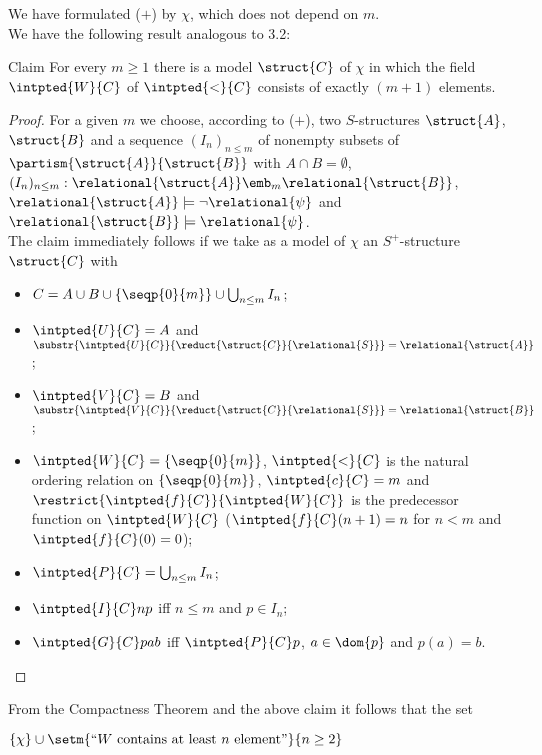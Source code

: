 \begin{enumerate}[1.]
\begin{itemize}
\end{itemize}
We have formulated ($+$) by $\chi$, which does not depend on $m$.\bigskip\\
We have the following result analogous to 3.2:\medskip\\
\begin{theorem}{Claim}
For every $m \geq 1$ there is a model $\struct{C}$ of $\chi$ in which the field $\intpted{W}{C}$ of $\intpted{<}{C}$ consists of exactly $(m + 1)$ elements.
\end{theorem}
\begin{proof}
For a given $m$ we choose, according to ($+$), two $S$-structures $\struct{A}$, $\struct{B}$ and a sequence $(I_n)_{n \leq m}$ of nonempty subsets of $\partism{\struct{A}}{\struct{B}}$ with $A \cap B = \emptyset$, $(I_n)_{n \leq m}: \relational{\struct{A}} \emb_m \relational{\struct{B}}$, $\relational{\struct{A}} \models \neg\relational{\psi}$ and $\relational{\struct{B}} \models \relational{\psi}$.\medskip\\
The claim immediately follows if we take as a model of $\chi$ an $S^+$-structure $\struct{C}$ with
\begin{itemize}
\item $C = A \cup B \cup \{\seqp{0}{m}\} \cup \bigcup_{n \leq m} I_n$;
\item $\intpted{U}{C} = A$ and $\substr{\intpted{U}{C}}{\reduct{\struct{C}}{\relational{S}}} = \relational{\struct{A}}$;
\item $\intpted{V}{C} = B$ and $\substr{\intpted{V}{C}}{\reduct{\struct{C}}{\relational{S}}} = \relational{\struct{B}}$;
\item $\intpted{W}{C} = \{\seqp{0}{m}\}$, $\intpted{<}{C}$ is the natural ordering relation on $\{\seqp{0}{m}\}$, $\intpted{c}{C} = m$ and $\restrict{\intpted{f}{C}}{\intpted{W}{C}}$ is the predecessor function on $\intpted{W}{C}$ ($\intpted{f}{C}(n + 1) = n$ for $n < m$ and $\intpted{f}{C}(0) = 0$);
\item $\intpted{P}{C} = \bigcup_{n \leq m} I_n$;
\item $\intpted{I}{C}np$ \quad iff \quad $n \leq m$ and $p \in I_n$;
\item $\intpted{G}{C}pab$ \quad iff \quad $\intpted{P}{C}p$, $a \in \dom{p}$ and $p(a) = b$. \qedhere
\end{itemize}
\end{proof}
From the Compactness Theorem and the above claim it follows that the set\smallskip\\
\centerline{$\{ \chi \} \cup \setm{\mbox{``\(W\) contains at least \(n\) element''}}{n \geq 2}$}\smallskip\\

\end{enumerate}
